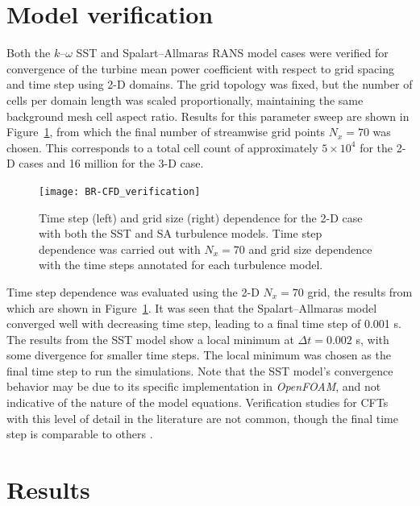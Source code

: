 \documentclass[aip,graphicx]{revtex4-1}
\begin{document}
\section{Model verification}

Both the $k$--$\omega$ SST and Spalart--Allmaras RANS model cases were verified
for convergence of the turbine mean power coefficient with respect to grid
spacing and time step using 2-D domains. The grid topology was fixed, but the
number of cells per domain length was scaled proportionally, maintaining the
same background mesh cell aspect ratio. Results for this parameter sweep are
shown in Figure~\ref{fig:2d-br-verification}, from which the final number of
streamwise grid points $N_x = 70$ was chosen. This corresponds to a total cell
count of approximately $5 \times 10^4$ for the 2-D cases and 16 million for the
3-D case.

\begin{figure}
    \centering
    
    \texttt{[image: BR-CFD\_verification]}
    
    \caption{Time step (left) and grid size (right) dependence for the 2-D case
        with both the SST and SA turbulence models. Time step dependence was carried
        out with $N_x=70$ and grid size dependence with the time steps annotated for
        each turbulence model.}
    
    \label{fig:2d-br-verification}
\end{figure}

Time step dependence was evaluated using the 2-D $N_x=70$ grid, the results from
which are shown in Figure~\ref{fig:2d-br-verification}. It was seen that the
Spalart--Allmaras model converged well with decreasing time step, leading to a
final time step of 0.001 s. The results from the SST model show a local minimum
at $\Delta t = 0.002$ s, with some divergence for smaller time steps. The local
minimum was chosen as the final time step to run the simulations. Note that the
SST model's convergence behavior may be due to its specific implementation in
\textit{OpenFOAM}, and not indicative of the nature of the model equations.
Verification studies for CFTs with this level of detail in the literature are
not common, though the final time step is comparable to others
\cite{Balduzzi2016}.


\section{Results}
\end{document}
